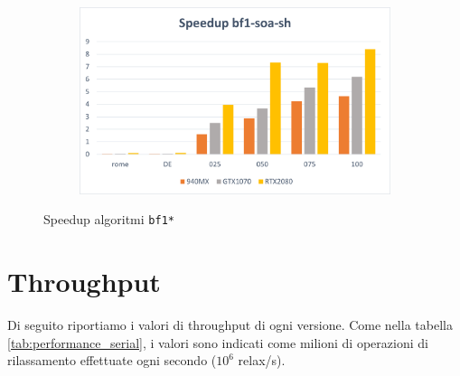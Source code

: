 \documentclass[12pt,a4paper]{book}
\begin{document}
\begin{figure}[b]
\begin{subfigure}{.5\textwidth}
		\end{subfigure}%
		\begin{subfigure}{.5\textwidth}
			\centering
			\includegraphics[width=\textwidth]{speedup_bf1-soa-sh}
		\end{subfigure}
		\caption{Speedup algoritmi \texttt{bf1*}}
		\label{fig:speedup_bf1}
	\end{figure}
	
	\section{Throughput}
	Di seguito riportiamo i valori di throughput di ogni versione. Come nella tabella \ref{tab:performance_serial}, i valori sono indicati come milioni di operazioni di rilassamento effettuate ogni secondo ($10^6$ relax/s).
	
\end{document}
